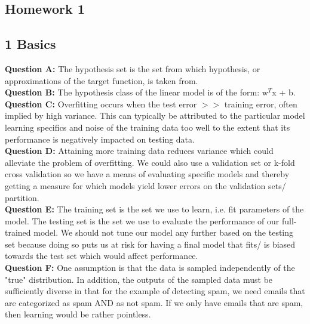 \documentclass[12 pt]{article}
\begin{document}
	\begin{center}
		\section*{Homework 1}
	\end{center}
	
	
	\subsection*{1 Basics}	
	\textbf{Question A:} The hypothesis set is the set from which hypothesis, or approximations of the target function, is taken from. \\
	
	\noindent\textbf{Question B:} The hypothesis class of the linear model is of the form: w$^T$x + b. \\
	
	\noindent\textbf{Question C:} Overfitting occurs when the test error $>$$>$ training error, often implied by high variance. This can typically be attributed to the particular model learning specifics and noise of the training data too well to the extent that its performance is negatively impacted on testing data. \\
	
	\noindent\textbf{Question D:} Attaining more training data reduces variance which could alleviate the problem of overfitting. We could also use a validation set or k-fold cross validation so we have a means of evaluating specific models and thereby getting a measure for which models yield lower errors on the validation sets/ partition. \\
	
	\noindent\textbf{Question E:} The training set is the set we use to learn, i.e. fit parameters of the model. The testing set is the set we use to evaluate the performance of our full-trained model. We should not tune our model any further based on the testing set because doing so puts us at risk for having a final model that fits/ is biased towards the test set which would affect performance. \\
	
	\noindent\textbf{Question F:} One assumption is that the data is sampled independently of the "true" distribution. In addition, the outputs of the sampled data must be sufficiently diverse in that for the example of detecting spam, we need emails that are categorized as spam AND as not spam. If we only have emails that are spam, then learning would be rather pointless. \\
	
\end{document}
